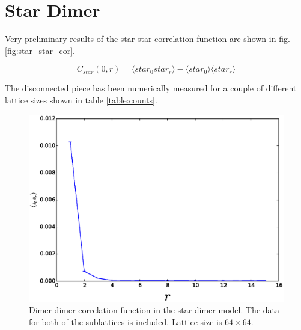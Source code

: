\documentclass[aps,floatfix,11pt]{revtex4-1}
\begin{document}
\clearpage

\section{Star Dimer}

Very preliminary results of the star star correlation function are shown in fig.
\ref{fig:star_star_cor}. 

\begin{equation}
    \label{}
    C_{star}(0,r) =  \langle star_0 star_r \rangle -\langle star_0 \rangle \langle star_r \rangle
\end{equation}

\noindent
The disconnected piece has been numerically measured for a couple of different lattice sizes shown
in table \ref{table:counts}.

%

\begin{figure}[h]
    \centering
    \includegraphics[width=8.5 cm]{s_dimer_dimer_cor}
    \caption{Dimer dimer correlation function in the star dimer model. The data for both of the
        sublattices is included. Lattice size is $64\times
    64$. \label{fig:s_dimer_dimer}}
\end{figure}
\end{document}

